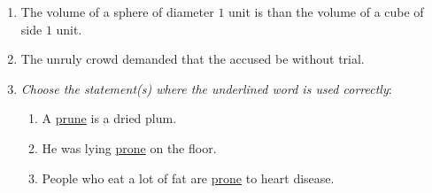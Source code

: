 \documentclass[journal]{IEEEtran}
\begin{document}
\begin{enumerate}[leftmargin=0pt]
\item The volume of a sphere of diameter $1$ unit is \underline{\hspace{1.5cm}} than the volume of a cube of side $1$ unit.
  \begin{enumerate}
  \end{enumerate}

  \hfill{}


\item The unruly crowd demanded that the accused be \underline{\hspace{1.5cm}} without trial.
  \begin{enumerate}
  \end{enumerate}

  \hfill{}


\item \textit{Choose the statement(s) where the underlined word is used correctly}:
  \begin{enumerate}[label=(\Roman*)]
\item A \underline{prune} is a dried plum.
    \item He was lying \underline{prone} on the floor.
    \item People who eat a lot of fat are \underline{prone} to heart disease.
  \end{enumerate}
  
  \begin{enumerate}
  \end{enumerate}


\end{enumerate}
\end{document}
